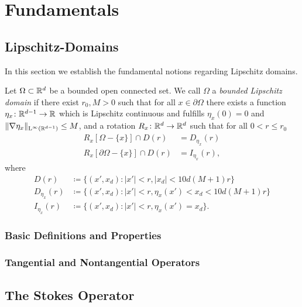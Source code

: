 \chapter{Fundamentals}

\section{Lipschitz-Domains}

In this section we establish the fundamental notions regarding Lipschitz domains.

\begin{defn}
  Let $\Omega \subset \mathbb{R}^d$ be a bounded open connected set.
  We call $\Omega$ a \emph{bounded Lipschitz domain} if there exist $r_0, M > 0$ such that for all $x \in \partial\Omega$ there exists a function $\eta_x \colon \mathbb{R}^{d - 1} \to \mathbb{R}$ which is Lipschitz continuous and fulfills $\eta_x(0) = 0$ and $\|\nabla \eta_x \|_{\mathrm{L}^\infty(\mathbb{R}^{d - 1})} \leq M$, and a rotation $R_x \colon \mathbb{R}^d \to \mathbb{R}^d$ such that for all $0 < r \leq r_0$ 
  \begin{align*}
    R_x[ \Omega - \{x\} ] \cap D(r) &= D_{\eta_x}(r) \\
    R_x[\partial\Omega - \{x\}] \cap D(r) &= I_{\eta_x}(r),
  \end{align*}
  where
  \begin{align*}
    D(r) &\coloneqq \{ (x', x_d) \colon |x'| < r, |x_d| < 10 d (M + 1) r\} \\
    D_{\eta_x}(r) &\coloneqq \{ (x', x_d) \colon |x'| < r, \eta_x(x') < x_d < 10 d(M+ 1)r\} \\
    I_{\eta_x}(r) &\coloneqq \{ (x', x_d) \colon |x'| < r, \eta_x(x') = x_d \} .
  \end{align*}
\end{defn}

\subsection{Basic Definitions and Properties}

\subsection{Tangential and Nontangential Operators}


\section{The Stokes Operator}


